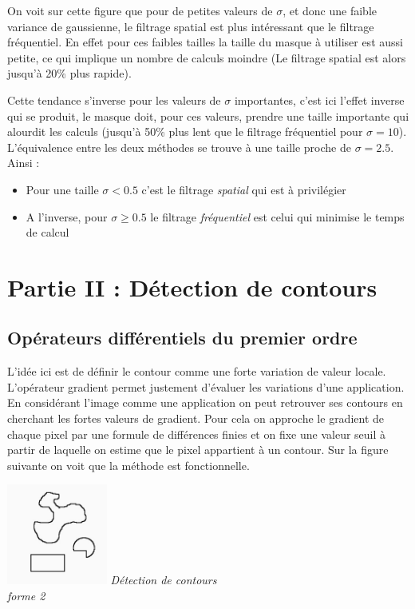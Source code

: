 \documentclass[a4,12pt]{article}
\begin{document}
On voit sur cette figure que pour de petites valeurs de $\sigma$, et donc une faible variance de gaussienne, le filtrage spatial est plus intéressant que le filtrage fréquentiel. En effet pour ces faibles tailles la taille du masque à utiliser est aussi petite, ce qui implique un nombre de calculs moindre (Le filtrage spatial est alors jusqu'à 20\% plus rapide).

Cette tendance s'inverse pour les valeurs de $\sigma$ importantes, c'est ici l'effet inverse qui se produit, le masque doit, pour ces valeurs, prendre une taille importante qui alourdit les calculs (jusqu'à 50\% plus lent que le filtrage fréquentiel pour $\sigma=10$).\\

\noindent
L'équivalence entre les deux méthodes se trouve à une taille proche de $\sigma = 2.5$. Ainsi :
\begin{itemize}
	\item Pour une taille $\sigma < 0.5$ c'est le filtrage \textit{spatial} qui est à privilégier
	\item A l'inverse, pour $\sigma \geq 0.5$ le filtrage \textit{fréquentiel} est celui qui minimise le temps de calcul
\end{itemize}


\section{Partie II : Détection de contours}

\subsection{Opérateurs différentiels du premier ordre}
L'idée ici est de définir le contour comme une forte variation de valeur locale. L'opérateur gradient permet justement d'évaluer les variations d'une application.
En considérant l'image comme une application on peut retrouver ses contours en cherchant les fortes valeurs de gradient.
Pour cela on approche le gradient de chaque pixel par une formule de différences finies et on fixe une valeur seuil à partir de laquelle on estime que le pixel appartient à un contour.
Sur la figure suivante on voit que la méthode est fonctionnelle.\\

\noindent
\begin{center}
\begin{minipage}[c]{0.20\linewidth}
	\begin{center}
		\includegraphics[width = 33mm]{./img/p2test_grad_mean_formes2.jpg}
		\textit{Détection de contours\\ forme 2}
	\end{center}
\end{minipage}
\end{center}
\end{document}
